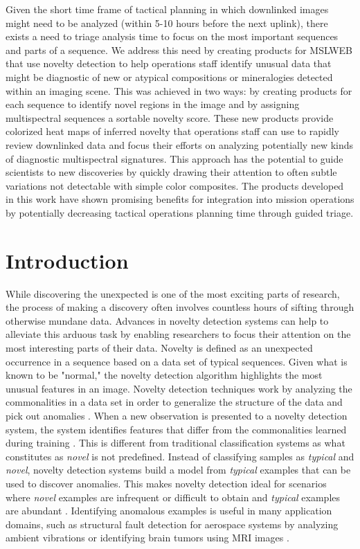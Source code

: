 Given the short time frame of tactical planning in which downlinked images might need to be analyzed (within 5-10 hours before the next uplink), there exists a need to triage analysis time to focus on the most important sequences and parts of a sequence. 
We address this need by creating products for MSLWEB that use novelty detection to help operations staff identify unusual data that might be diagnostic of new or atypical compositions or mineralogies detected within an imaging scene. 
This was achieved in two ways: by creating products for each sequence to identify novel regions in the image and by assigning multispectral sequences a sortable novelty score. 
These new products provide colorized heat maps of inferred novelty that operations staff can use to rapidly review downlinked data and focus their efforts on analyzing potentially new kinds of diagnostic multispectral signatures. 
This approach has the potential to guide scientists to new discoveries by quickly drawing their attention to often subtle variations not detectable with simple color composites.
The products developed in this work have shown promising benefits for integration into mission operations by potentially decreasing tactical operations planning time through guided triage.

\section{Introduction}
While discovering the unexpected is one of the most exciting parts of research, the process of making a discovery often involves countless hours of sifting through otherwise mundane data. 
Advances in novelty detection systems can help to alleviate this arduous task by enabling researchers to focus their attention on the most interesting parts of their data. 
Novelty is defined as an unexpected occurrence in a sequence based on a data set of typical sequences.
Given what is known to be "normal," the novelty detection algorithm highlights the most unusual features in an image. 
Novelty detection techniques work by analyzing the commonalities in a data set in order to generalize the structure of the data and pick out anomalies \parencite{japkowicz1995novelty}.
When a new observation is presented to a novelty detection system, the system identifies features that differ from the commonalities learned during training \parencite{markou2003novelty}.
This is different from traditional classification systems as what constitutes as \textit{novel} is not predefined. 
Instead of classifying samples as \textit{typical} and \textit{novel}, novelty detection systems build a model from \textit{typical} examples that can be used to discover anomalies. 
This makes novelty detection ideal for scenarios where \textit{novel} examples are infrequent or difficult to obtain and \textit{typical} examples are abundant \parencite{japkowicz1995novelty}.
Identifying anomalous examples is useful in many application domains, such as structural fault detection for aerospace systems by analyzing ambient vibrations \parencite{worden1997structural} or identifying brain tumors using MRI images \parencite{wang2020brain}.


